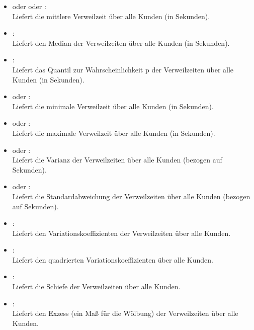 \begin{itemize}

\item
{} oder  oder :\\
Liefert die mittlere Verweilzeit über alle Kunden (in Sekunden).

\item
{}:\\
Liefert den Median der Verweilzeiten über alle Kunden (in Sekunden).

\item
{}:\\
Liefert das Quantil zur Wahrscheinlichkeit p der Verweilzeiten über alle Kunden (in Sekunden).

\item
{} oder :\\
Liefert die minimale Verweilzeit über alle Kunden (in Sekunden).

\item
{} oder :\\
Liefert die maximale Verweilzeit über alle Kunden (in Sekunden).

\item
{} oder :\\
Liefert die Varianz der Verweilzeiten über alle Kunden (bezogen auf Sekunden).

\item
{} oder :\\
Liefert die Standardabweichung der Verweilzeiten über alle Kunden (bezogen auf Sekunden).

\item
{}:\\
Liefert den Variationskoeffizienten der Verweilzeiten über alle Kunden.

\item
{}:\\
Liefert den quadrierten Variationskoeffizienten über alle Kunden.

\item
{}:\\
Liefert die Schiefe der Verweilzeiten über alle Kunden.

\item
{}:\\
Liefert den Exzess (ein Maß für die Wölbung) der Verweilzeiten über alle Kunden.


\end{itemize}
